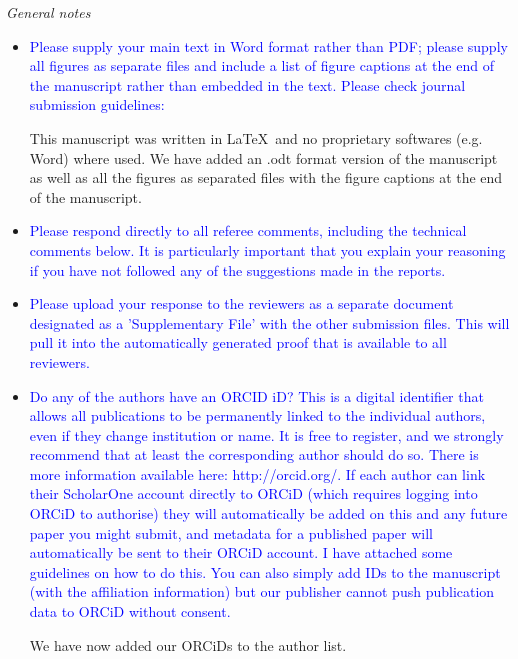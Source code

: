 \documentclass[12pt,letterpaper]{article}
\renewcommand{\subsection}[1]{%
\bigskip
\begin{center}
\begin{large}
\normalfont\itshape #1
\end{large}
\end{center}}
\begin{document}
\subsection{General notes}
\begin{itemize}
\item{\textcolor{blue}{Please supply your main text in Word format rather than PDF; please supply all figures as separate files and include a list of figure captions at the end of the manuscript rather than embedded in the text. Please check journal submission guidelines:}}

This manuscript was written in \LaTeX\ and no proprietary softwares (e.g. Word) where used. We have added an .odt format version of the manuscript as well as all the figures as separated files with the figure captions at the end of the manuscript.

\item{\textcolor{blue}{Please respond directly to all referee comments, including the technical comments below. It is particularly important that you explain your reasoning if you have not followed any of the suggestions made in the reports.}}

\item{\textcolor{blue}{Please upload your response to the reviewers as a separate document designated as a 'Supplementary File' with the other submission files. This will pull it into the automatically generated proof that is available to all reviewers.}}

\item{\textcolor{blue}{Do any of the authors have an ORCID iD? This is a digital identifier that allows all publications to be permanently linked to the individual authors, even if they change institution or name. It is free to register, and we strongly recommend that at least the corresponding author should do so. There is more information available here: http://orcid.org/. If each author can link their ScholarOne account directly to ORCiD (which requires logging into ORCiD to authorise) they will automatically be added on this and any future paper you might submit, and metadata for a published paper will automatically be sent to their ORCiD account. I have attached some guidelines on how to do this. You can also simply add IDs to the manuscript (with the affiliation information) but our publisher cannot push publication data to ORCiD without consent.}}

We have now added our ORCiDs to the author list.

\end{itemize}
\end{document}
